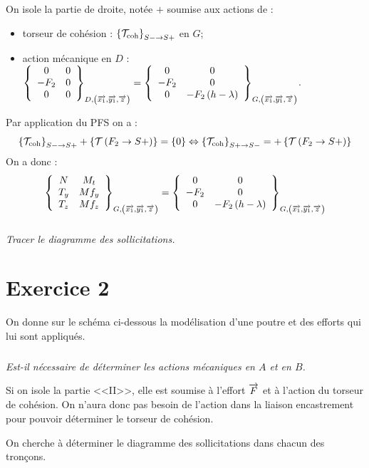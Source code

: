 \documentclass[10pt,fleqn]{article} %
\begin{document}
\begin{multicols}{2}
\begin{corrige}
On isole la partie de droite, notée $+$ soumise aux actions de :
\begin{itemize}[label=,font=\color{ocre}] 
\item torseur de cohésion : $\torseurscoh_{S-\rightarrow S+}$ en $G$;
\item action mécanique en $D$ : $\torseurcol{0}{-F_2}{0}{0}{0}{0}{D,\left( \vect{x_1},\vect{y_1},\vect{z} \right)}  =\torseurcol{0}{-F_2}{0}{0}{0}{-F_2\left(h-\lambda\right)}{G,\left( \vect{x_1},\vect{y_1},\vect{z} \right)} $.
\end{itemize}


Par application du PFS on a : 
$$ \torseurscoh_{S-\rightarrow S+} +\torseurstat{T}{F_2}{S+} = \{0\} \Leftrightarrow \torseurscoh_{S+\rightarrow S-} =+\torseurstat{T}{F_2}{S+}  $$
On a donc  :
$$
\torseurcol{N}{T_y}{T_z}{M_t}{Mf_y}{Mf_z}{G,\left( \vect{x_1},\vect{y_1},\vect{z} \right)} = 
\torseurcol{0}{-F_2}{0}{0}{0}{-F_2\left(h-\lambda\right)}{G,\left( \vect{x_1},\vect{y_1},\vect{z} \right)}
$$



\end{corrige}
\else 
\fi


\subparagraph{}
\textit{Tracer le diagramme des sollicitations.}



\section*{Exercice 2}
\setcounter{subparagraph}{0}
On donne sur le schéma ci-dessous la modélisation d'une poutre et des efforts qui lui sont appliqués.
\subparagraph{}
\textit{Est-il nécessaire de déterminer les actions mécaniques en $A$ et en $B$.}
\ifprof
\begin{corrige}
Si on isole la partie <<II>>, elle est soumise à l'effort $\vect{F}$ et à l'action du torseur de cohésion. On n'aura donc pas besoin de l'action dans la liaison encastrement pour pouvoir déterminer le torseur de cohésion. 
\end{corrige}
\else 
\fi


On cherche à déterminer le diagramme des sollicitations dans chacun des tronçons.


\end{multicols}
\end{document}
